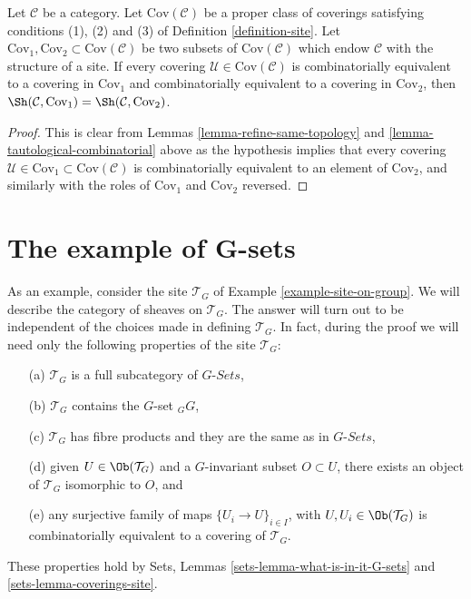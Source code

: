 \begin{lemma}
\label{lemma-choice-set-coverings-immaterial}
Let $\mathcal{C}$ be a category.
Let $\text{Cov}(\mathcal{C})$ be a proper class of coverings
satisfying conditions (1), (2) and (3) of Definition \ref{definition-site}.
Let $\text{Cov}_1, \text{Cov}_2 \subset \text{Cov}(\mathcal{C})$
be two subsets of $\text{Cov}(\mathcal{C})$ which endow
$\mathcal{C}$ with the structure of a site. If
every covering $\mathcal{U} \in \text{Cov}(\mathcal{C})$
is combinatorially equivalent to a covering in
$\text{Cov}_1$ and combinatorially equivalent to a
covering in $\text{Cov}_2$, then
$\Sh(\mathcal{C}, \text{Cov}_1) =
\Sh(\mathcal{C}, \text{Cov}_2)$.
\end{lemma}

\begin{proof}
This is clear from Lemmas \ref{lemma-refine-same-topology}
and \ref{lemma-tautological-combinatorial} above as the hypothesis
implies that every covering
$\mathcal{U} \in \text{Cov}_1 \subset \text{Cov}(\mathcal{C})$
is combinatorially equivalent to an element of $\text{Cov}_2$,
and similarly with the roles of $\text{Cov}_1$ and $\text{Cov}_2$
reversed.
\end{proof}
















\section{The example of G-sets}
\label{section-example-sheaf-G-sets}

\noindent
As an example, consider the site $\mathcal{T}_G$ of
Example \ref{example-site-on-group}. We will describe the
category of sheaves on $\mathcal{T}_G$. The answer will turn
out to be independent of the choices made in defining $\mathcal{T}_G$.
In fact, during the proof we will need only the following
properties of the site $\mathcal{T}_G$:
\begin{enumerate}
\item[(a)] $\mathcal{T}_G$ is a full subcategory of $G\textit{-Sets}$,
\item[(b)] $\mathcal{T}_G$ contains the $G$-set ${}_GG$,
\item[(c)] $\mathcal{T}_G$ has fibre products and they are the same as
in $G\textit{-Sets}$,
\item[(d)] given $U \in \Ob(\mathcal{T}_G)$ and a $G$-invariant
subset $O \subset U$, there exists an object of $\mathcal{T}_G$ isomorphic
to $O$, and
\item[(e)] any surjective family of maps $\{U_i \to U\}_{i \in I}$, with
$U, U_i \in \Ob(\mathcal{T}_G)$ is combinatorially equivalent to a
covering of $\mathcal{T}_G$.
\end{enumerate}
These properties hold by Sets, Lemmas \ref{sets-lemma-what-is-in-it-G-sets}
and \ref{sets-lemma-coverings-site}.

